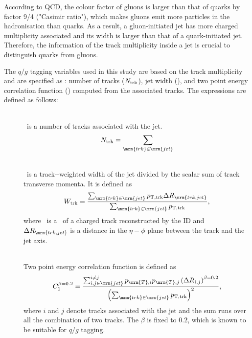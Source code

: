 According to QCD, the colour factor of gluons is larger than that of quarks by factor 9/4 ("Casimir ratio"), which makes gluons emit more particles in the hadronisation than quarks. As a result, a gluon-initiated jet has more charged multiplicity associated and its width is larger than that of a quark-initiated jet. Therefore, the information of the track multiplicity inside a jet is crucial to distinguish quarks from gluons.

The $q/g$ tagging variables used in this study are based on the track multiplicity and are specified as : number of tracks ($N_{\mathrm{trk}}$), jet width (\wtrk), and two point energy correlation function (\cbeta) computed from the associated tracks. The expressions are defined as follows:

\begin{description}

  \item[\ntrk] \mbox{} \\
    \ntrk~is a number of tracks associated with the jet. %
    \begin{equation}
    \ntrk = \sum_{\mrm{trk}\in\mrm{jet}}
    \end{equation}

  \item[\wtrk] \mbox{} \\
    \wtrk~is a track-\pt-weighted width of the jet divided by the scalar sum of track transverse momenta. %
    It is defined as %
    \begin{equation}
      \wtrk = \frac{ \sum_{\mrm{trk}\in\mrm{jet}}\pttrk\Delta R_{\mrm{trk,jet}} }{ \sum_{\mrm{trk}\in\mrm{jet}}\pttrk },
    \end{equation}
    where \pttrk~is a \pt~of a charged track reconstructed by the ID and %
    $\Delta R_{\mrm{trk,jet}}$ is a distance in the $\eta-\phi$ plane between the track and the jet axis. %

  \item[\cbeta] \mbox{} \\
    Two point energy correlation function is defined as %
    \begin{equation}
      \cbeta = \frac{ \sum_{i, j\in\mrm{jet}}^{i\neq j} p_{\mrm{T}, i}p_{\mrm{T}, j} \left( \Delta R_{i,j} \right)^{\beta=0.2} }%
        { \left( \sum_{\mrm{trk}\in\mrm{jet}} \pttrk  \right)^{2} }, 
    \end{equation}
    where $i$ and $j$ denote tracks associated with the jet and the sum runs over all the combination of two tracks. %
    The $\beta$ is fixed to $0.2$, which is known to be suitable for $q/g$ tagging.%

\end{description}


